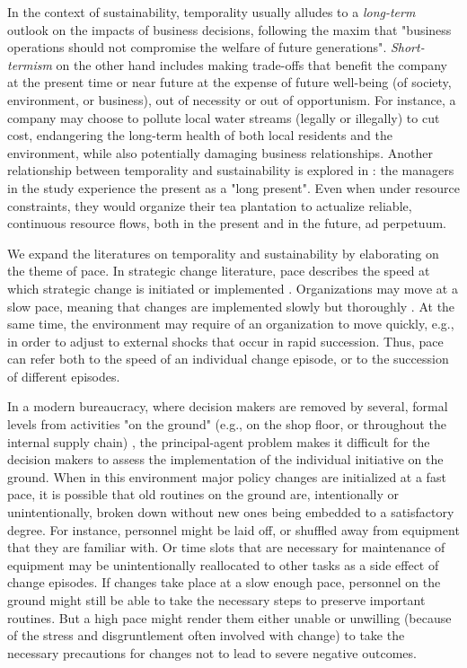 In the context of sustainability, temporality usually alludes to a \textit{long-term} outlook on the impacts of business decisions, following the maxim that "business operations should not compromise the welfare of future generations"\citep[p. 531]{Slawinski2015}. \textit{Short-termism} on the other hand includes making trade-offs that benefit the company at the present time or near future at the expense of future well-being (of society, environment, or business), out of necessity or out of opportunism. For instance, a company may choose to pollute local water streams (legally or illegally) to cut cost, endangering the long-term health of both local residents and the environment, while also potentially damaging business relationships\citep{Slawinski2015}. Another relationship between temporality and sustainability is explored in \citet{Kim2019}: the managers in the study experience the present as a "long present". Even when under resource constraints, they would organize their tea plantation to actualize reliable, continuous resource flows, both in the present and in the future, ad perpetuum.

We expand the literatures on temporality and sustainability by elaborating on the theme of pace. In strategic change literature, pace describes the speed at which strategic change is initiated or implemented \citep[p. 1026]{Kunisch2017}. Organizations may move at a slow pace, meaning that changes are implemented slowly but thoroughly \citep{Amis2004}. At the same time, the environment may require of an organization to move quickly, e.g., in order to adjust to external shocks that occur in rapid succession. Thus, pace can refer both to the speed of an individual change episode, or to the succession of different episodes. 

In a modern bureaucracy, where decision makers are removed by several, formal levels from activities "on the ground" (e.g., on the shop floor, or throughout the internal supply chain) \citep[p. 147]{DiMaggio1983}, the principal-agent problem makes it difficult for the decision makers to assess the implementation of the individual initiative on the ground. When in this environment major policy changes are initialized at a fast pace, it is possible that old routines on the ground are, intentionally or unintentionally, broken down without new ones being embedded to a satisfactory degree. For instance, personnel might be laid off, or shuffled away from equipment that they are familiar with. Or time slots that are necessary for maintenance of equipment may be unintentionally reallocated to other tasks as a side effect of change episodes. If changes take place at a slow enough pace, personnel on the ground might still be able to take the necessary steps to preserve important routines. But a high pace might render them either unable or unwilling (because of the stress and disgruntlement often involved with change) to take the necessary precautions for changes not to lead to severe negative outcomes.

